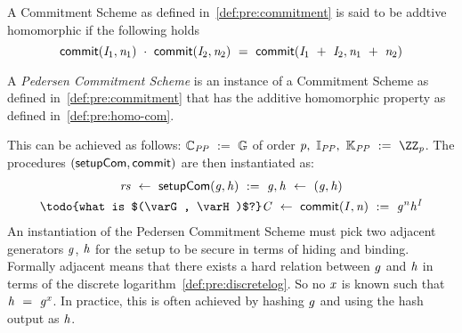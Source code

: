 \begin{definition}\label{def:pre:homo-com}
    A Commitment Scheme as defined in~\cref{def:pre:commitment} is said to be addtive homomorphic if the following holds~\cite{bunz2018bulletproofs}
    \[ \mathsf{commit}(\mathit{I}_1, \mathit{n}_1) ~\cdot~ \mathsf{commit}(\mathit{I}_2, \mathit{n}_2) ~=~ \mathsf{commit}(\mathit{I}_1 ~+~ \mathit{I}_2, \mathit{n}_1 ~+~ \mathit{n}_2) \]
\end{definition}



\begin{definition}\label{def:pre:pedersen}
    A \emph{Pedersen Commitment Scheme} is an instance of a Commitment Scheme as defined in~\cref{def:pre:commitment} that has the additive homomorphic property as defined in~\cref{def:pre:homo-com}.

This can be achieved as follows:
    $\mathbb{C}_{\mathit{PP}} ~:=~ \mathbb{G}$ of order $\varPrime \opSeperate \varInputSpace_{\varPublicParam} \opSeperate \varRandSpace_{\varPublicParam} \opAssign \cnstIntegersPrime{\varPrime}$.
    The procedures $(\mathsf{setupCom}, \mathsf{commit})$ are then instantiated as:
    \begin{gather*}
        \varCommitParams \opFunResult \procSetupComPed{\varG}{\varH} \opAssign \varG, \varH \opFunResult (\varG, \varH)\\ \todo{what is $(\varG, \varH)$?}
        \varCommitment \opFunResult \procCommit{\varInput}{\varNonce} \opAssign \funGen{\varNonce} \funGenH{\varInput}\\
    \end{gather*}
    An instantiation of the Pedersen Commitment Scheme must pick two adjacent generators $\mathit{g}$, $\mathit{h}$ for the setup to be secure in terms of hiding and binding.
    Formally adjacent means that there exists a hard relation between $\mathit{g}$ and $\mathit{h}$ in terms of the discrete logarithm~\cref{def:pre:discretelog}.
So no $\mathit{x}$ is known such that $\mathit{h} ~=~ \mathit{g}^{x}$.
    In practice, this is often achieved by hashing $\mathit{g}$ and using the hash output as $\mathit{h}$. 

\end{definition}




